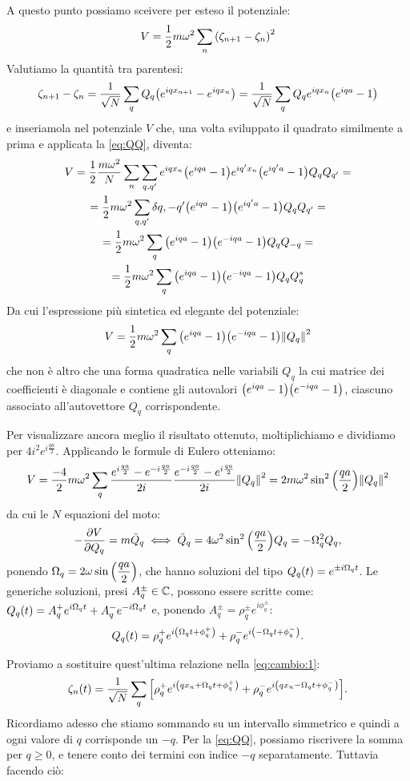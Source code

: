     \par A questo punto possiamo sceivere per esteso il potenziale: $$V=\frac{1}{2}m\omega^2\sum_n\qty(\zeta_{n+1}-\zeta_n)^2$$ Valutiamo la quantit\`a tra parentesi: $$\zeta_{n+1}-\zeta_n=\frac{1}{\sqrt{N}}\sum_qQ_q\qty(e^{iqx_{n+1}}-e^{iqx_n})=\frac{1}{\sqrt{N}}\sum_qQ_qe^{iqx_n}\qty(e^{iqa}-1)$$ e inseriamola nel potenziale $V$ che, una volta sviluppato il quadrato similmente a prima e applicata la \eqref{eq:QQ}, diventa:
    \begin{multline*}
        V=\frac{1}{2}\frac{m\omega^2}{N}\sum_n\sum_{q,q'}e^{iqx_n}\qty(e^{iqa}-1)e^{iq'x_n}\bigl(e^{iq'a}-1\bigr)Q_qQ_{q'}=\\=\frac{1}{2}m\omega^2\sum_{q,q'}\delta{q,-q'}\qty(e^{iqa}-1)\bigl(e^{iq'a}-1\bigr)Q_qQ_{q'}=\\=\frac{1}{2}m\omega^2\sum_q\qty(e^{iqa}-1)\qty(e^{-iqa}-1)Q_qQ_{-q}=\\=\frac{1}{2}m\omega^2\sum_q\qty(e^{iqa}-1)\qty(e^{-iqa}-1)Q_qQ_q^*
    \end{multline*}
    Da cui l'espressione pi\`u sintetica ed elegante del potenziale:
    \begin{equation}
        V=\frac{1}{2}m\omega^2\sum_q\qty(e^{iqa}-1)\qty(e^{-iqa}-1)\norm{Q_q}^2
    \end{equation}
    che non \`e altro che una forma quadratica nelle variabili $Q_q$ la cui matrice dei coefficienti \`e diagonale e contiene gli autovalori $\qty(e^{iqa}-1)\qty(e^{-iqa}-1)$, ciascuno associato all'autovettore $Q_q$ corrispondente. \par Per visualizzare ancora meglio il risultato ottenuto, moltiplichiamo e dividiamo per $\displaystyle 4i^2e^{i\frac{qa}{2}}$. Applicando le formule di Eulero otteniamo: $$V=\frac{-4}{2}m\omega^2\sum_q\frac{e^{i\frac{qa}{2}}-e^{-i\frac{qa}{2}}}{2i}\frac{e^{-i\frac{qa}{2}}-e^{i\frac{qa}{2}}}{2i}\norm{Q_q}^2=2m\omega^2\sin^2\qty(\frac{qa}{2})\norm{Q_q}^2$$ da cui le $N$ equazioni del moto: $$-\pdv{V}{Q_q}=m\ddot{Q}_q \iff \ddot{Q}_q=4\omega^2\sin^2\qty(\frac{qa}{2})Q_q=-\Omega_q^2Q_q,$$ ponendo $\displaystyle\Omega_q=2\omega\sin\qty(\frac{qa}{2})$, che hanno soluzioni del tipo $\displaystyle Q_q\qty(t)=e^{\pm i\Omega_qt}$. Le generiche soluzioni, presi $A_q^\pm\in\mathbb{C}$, possono essere scritte come: $\displaystyle Q_q\qty(t)=A_q^+e^{i\Omega_qt}+A_q^-e^{-i\Omega_qt}$ e, ponendo $\displaystyle A_q^\pm=\rho_q^\pm e^{i\phi_q^\pm}$: $$Q_q\qty(t)=\rho_q^+e^{i\qty(\Omega_qt+\phi_q^+)}+\rho_q^-e^{i\qty(-\Omega_qt+\phi_q^-)}.$$
    \par Proviamo a sostituire quest'ultima relazione nella \eqref{eq:cambio:1}: $$\zeta_n\qty(t)=\frac{1}{\sqrt{N}}\sum_q\qty[\rho_q^+e^{i\qty(qx_n+\Omega_qt+\phi_q^+)}+\rho_q^-e^{i\qty(qx_n-\Omega_qt+\phi_q^-)}].$$ Ricordiamo adesso che stiamo sommando su un intervallo simmetrico e quindi a ogni valore di $q$ corrisponde un $-q$. Per la \eqref{eq:QQ}, possiamo riscrivere la somma per $q\geq 0$, e tenere conto dei termini con indice $-q$ separatamente. Tuttavia facendo ci\`o: 
